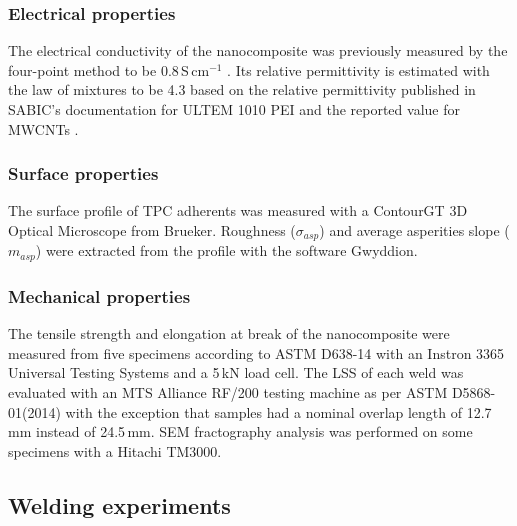 \subsubsection{Electrical properties}

The electrical conductivity of the nanocomposite was previously measured by the four-point method to be \mbox{0.8\,S\,cm$^{-1}$} \cite{Brassard2019a}. 
Its relative permittivity is estimated with the law of mixtures to be 4.3 based on the relative permittivity published in SABIC’s documentation for ULTEM 1010 PEI and the reported value for MWCNTs \cite{Katsounaros2011}. 

\subsubsection{Surface properties}

The surface profile of TPC adherents was measured with a ContourGT 3D Optical Microscope from Brueker. 
Roughness ($\sigma_{asp}$) and average asperities slope ($m_{asp}$) were extracted from the profile with the software Gwyddion.

\subsubsection{Mechanical properties}

The tensile strength and elongation at break of the nanocomposite were measured from five specimens according to ASTM D638-14 with an Instron 3365 Universal Testing Systems and a \mbox{5\,kN} load cell. 
The LSS of each weld was evaluated with an MTS Alliance RF/200 testing machine as per ASTM D5868-01(2014) with the exception that samples had a nominal overlap length of \mbox{12.7\,mm} instead of \mbox{24.5\,mm}. 
SEM fractography analysis was performed on some specimens with a Hitachi TM3000. 

\subsection{Welding experiments}

